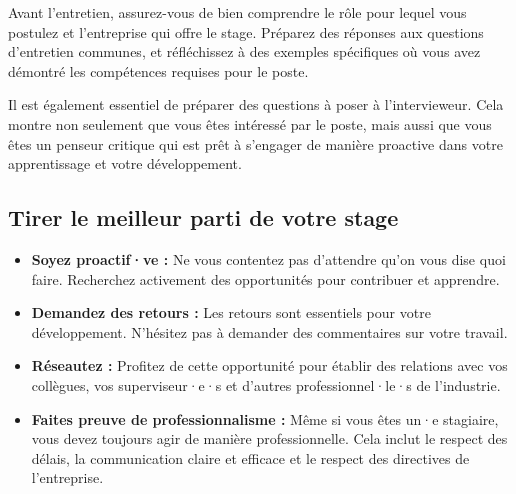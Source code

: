 Avant l'entretien, assurez-vous de bien comprendre le rôle pour lequel vous postulez et l'entreprise qui offre le stage. Préparez des réponses aux questions d'entretien communes, et réfléchissez à des exemples spécifiques où vous avez démontré les compétences requises pour le poste.

Il est également essentiel de préparer des questions à poser à l'intervieweur. Cela montre non seulement que vous êtes intéressé par le poste, mais aussi que vous êtes un penseur critique qui est prêt à s'engager de manière proactive dans votre apprentissage et votre développement.

\subsection{Tirer le meilleur parti de votre stage}
\label{sec:making-the-most-of-your-internship}


\begin{itemize}
    \item \textbf{Soyez proactif·ve :} Ne vous contentez pas d'attendre qu'on vous dise quoi faire. Recherchez activement des opportunités pour contribuer et apprendre.
    \item \textbf{Demandez des retours :} Les retours sont essentiels pour votre développement. N'hésitez pas à demander des commentaires sur votre travail.
    \item \textbf{Réseautez :} Profitez de cette opportunité pour établir des relations avec vos collègues, vos superviseur·e·s et d'autres professionnel·le·s de l'industrie.
    \item \textbf{Faites preuve de professionnalisme :} Même si vous êtes un·e stagiaire, vous devez toujours agir de manière professionnelle. Cela inclut le respect des délais, la communication claire et efficace et le respect des directives de l'entreprise.
\end{itemize}


